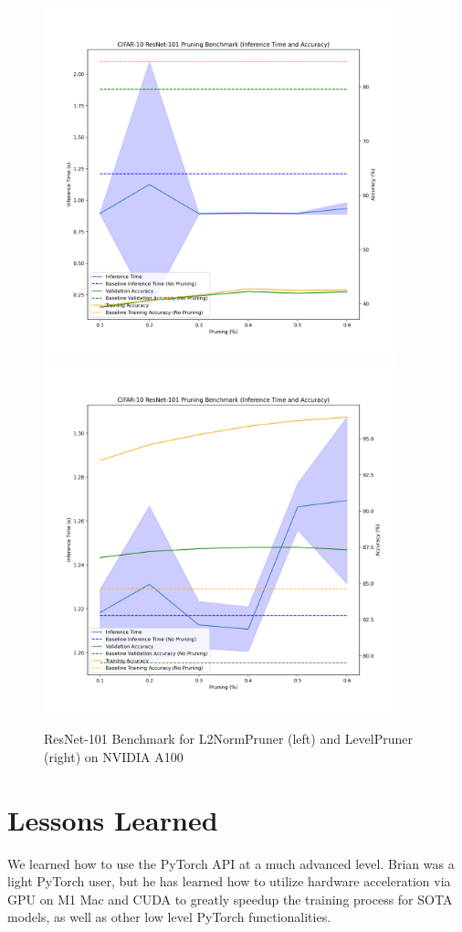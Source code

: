 \documentclass{article}
\begin{document}
\begin{figure}
	\centerline{
		\includegraphics[width=4in]{../proj1/figures/resnet101_benchmark_l2.png}
		\includegraphics[width=4in]{../proj1/figures/resnet101_benchmark_level.png}
	}
	\caption{ResNet-101 Benchmark for L2NormPruner (left) and LevelPruner (right) on NVIDIA A100}
	\label{fig:otherpruner}
\end{figure}


\section{Lessons Learned}
We learned how to use the PyTorch API at a much advanced level. Brian was a light PyTorch user, but he has learned how to utilize hardware acceleration via GPU on M1 Mac and CUDA to greatly speedup the training process for SOTA models, as well as other low level PyTorch functionalities.
\end{document}
